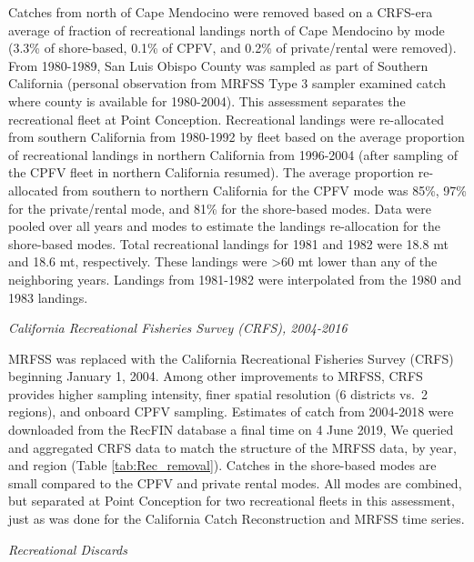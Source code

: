 \documentclass[12pt,]{article}
\begin{document}
Catches from north of Cape Mendocino were removed based on a CRFS-era
average of fraction of recreational landings north of Cape Mendocino by
mode (3.3\% of shore-based, 0.1\% of CPFV, and 0.2\% of private/rental
were removed). From 1980-1989, San Luis Obispo County was sampled as
part of Southern California (personal observation from MRFSS Type 3
sampler examined catch where county is available for 1980-2004). This
assessment separates the recreational fleet at Point Conception.
Recreational landings were re-allocated from southern California from
1980-1992 by fleet based on the average proportion of recreational
landings in northern California from 1996-2004 (after sampling of the
CPFV fleet in northern California resumed). The average proportion
re-allocated from southern to northern California for the CPFV mode was
85\%, 97\% for the private/rental mode, and 81\% for the shore-based
modes. Data were pooled over all years and modes to estimate the
landings re-allocation for the shore-based modes. Total recreational
landings for 1981 and 1982 were 18.8 mt and 18.6 mt, respectively. These
landings were \textgreater{}60 mt lower than any of the neighboring
years. Landings from 1981-1982 were interpolated from the 1980 and 1983
landings.

\emph{California Recreational Fisheries Survey (CRFS), 2004-2016}

MRFSS was replaced with the California Recreational Fisheries Survey
(CRFS) beginning January 1, 2004. Among other improvements to MRFSS,
CRFS provides higher sampling intensity, finer spatial resolution (6
districts vs.~2 regions), and onboard CPFV sampling. Estimates of catch
from 2004-2018 were downloaded from the RecFIN database a final time on
4 June 2019, We queried and aggregated CRFS data to match the structure
of the MRFSS data, by year, and region (Table \ref{tab:Rec_removal}).
Catches in the shore-based modes are small compared to the CPFV and
private rental modes. All modes are combined, but separated at Point
Conception for two recreational fleets in this assessment, just as was
done for the California Catch Reconstruction and MRFSS time series.

\emph{Recreational Discards}
\end{document}
